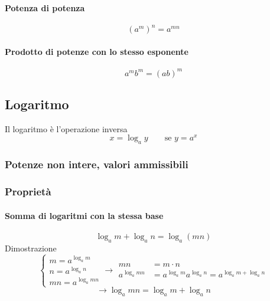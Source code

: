 \paragraph{Potenza di potenza}
\begin{equation} (a^m)^n = a^{mn} \end{equation}
\paragraph{Prodotto di potenze con lo stesso esponente}
\begin{equation} a^m b^m = (ab)^{m} \end{equation}

\subsection{Logaritmo}
\begin{definition}[Logaritmo] Il logaritmo è l'operazione inversa
\begin{equation}
    x = \log_a y \qquad \text{se $y = a^x$}
\end{equation}
\end{definition}
\subsubsection{Potenze non intere, valori ammissibili}
\subsubsection{Proprietà}
\paragraph{Somma di logaritmi con la stessa base}
\begin{equation}
  \log_a m + \log_a n = \log_a (mn)
\end{equation}
Dimostrazione
\begin{equation}
\begin{cases}
  m = a^{\log_a m} \\
  n = a^{\log_a n} \\
  mn = a^{\log_a mn}
\end{cases}
\rightarrow
\begin{aligned}
    mn & = m \cdot n \\
    a^{\log_a mn} & = a^{\log_a m} a^{\log_a n} = a^{\log_a m + \log_a n}
\end{aligned}
\end{equation}
\begin{equation}
  \rightarrow \log_a mn = \log_a m + \log_a n
\end{equation}
